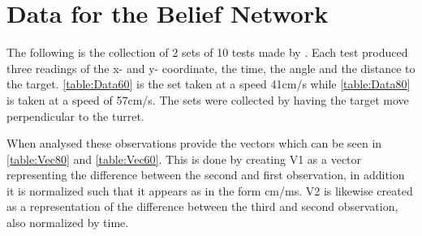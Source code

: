\chapter{Data for the Belief Network}\label{AppendixMIData}
The following is the collection of 2 sets of 10 tests made by \name. Each test
produced three readings of the x- and y- coordinate, the time, the angle and the
distance to the target. \autoref{table:Data60} is the set taken at a speed
41cm/s while \autoref{table:Data80} is taken at a speed of 57cm/s. The sets were
collected by having the target move perpendicular to the turret.
 

When analysed these observations provide the vectors which can be seen in
\autoref{table:Vec80} and \autoref{table:Vec60}. This is done by creating V1 as
a vector representing the difference between the second and first observation,
in addition it is normalized such that it appears as in the form cm/ms. V2 is
likewise created as a representation of the difference between the third and
second observation, also normalized by time.

